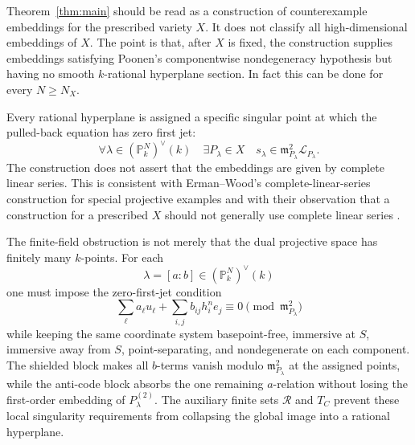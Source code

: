 \documentclass{lms}
\newcommand{\PP}{\mathbb P}
\newcommand{\LL}{\mathcal L}
\newcommand{\mm}{\mathfrak m}
\begin{document}
\begin{remark}
Theorem~\ref{thm:main} should be read as a construction of counterexample embeddings for the prescribed variety $X$.  It does not classify all high-dimensional embeddings of $X$.  The point is that, after $X$ is fixed, the construction supplies embeddings satisfying Poonen's componentwise nondegeneracy hypothesis but having no smooth $k$-rational hyperplane section.  In fact this can be done for every $N\ge N_X$.

Every rational hyperplane is assigned a specific singular point at which the pulled-back equation has zero first jet:
\[
        \forall\lambda\in(\PP^N_k)^\vee(k)
        \quad
        \exists P_\lambda\in X
        \quad
        s_\lambda\in\mm_{P_\lambda}^2\LL_{P_\lambda}.
\]
The construction does not assert that the embeddings are given by complete linear series.  This is consistent with Erman--Wood's complete-linear-series construction for special projective examples and with their observation that a construction for a prescribed $X$ should not generally use complete linear series \cite[Remark 9.4]{ErmanWood2015}.
\end{remark}

\begin{remark}
The finite-field obstruction is not merely that the dual projective space has finitely many $k$-points.  For each
\[
        \lambda=[a:b]\in(\PP^N_k)^\vee(k)
\]
one must impose the zero-first-jet condition
\[
        \sum_\ell a_\ell u_\ell+
        \sum_{i,j}b_{ij}h_i^n e_j
        \equiv0\pmod{\mm_{P_\lambda}^2}
\]
while keeping the same coordinate system basepoint-free, immersive at $S$, immersive away from $S$, point-separating, and nondegenerate on each component.  The shielded block makes all $b$-terms vanish modulo $\mm_{P_\lambda}^2$ at the assigned points, while the anti-code block absorbs the one remaining $a$-relation without losing the first-order embedding of $P_\lambda^{(2)}$.  The auxiliary finite sets $\mathcal R$ and $T_C$ prevent these local singularity requirements from collapsing the global image into a rational hyperplane.
\end{remark}
\end{document}
